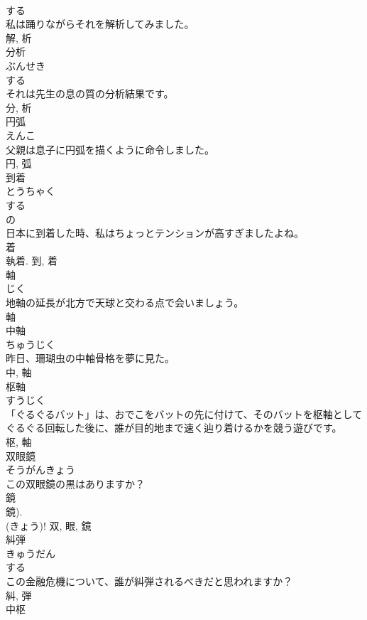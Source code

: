 \documentclass[8pt]{extreport}
\begin{document}
\begin{CJK}{UTF8}{min}
\\	する 
\\	私は踊りながらそれを解析してみました。	
\\	解, 析	
\\	分析	
\\	ぶんせき	
\\	する 
\\	それは先生の息の質の分析結果です。	
\\	分, 析	
\\	円弧	
\\	えんこ	
\\	父親は息子に円弧を描くように命令しました。	
\\	円, 弧	
\\	到着	
\\	とうちゃく	
\\	する 
\\	の 
\\	日本に到着した時、私はちょっとテンションが高すぎましたよね。	
\\	着 
\\	執着.	到, 着	
\\	軸	
\\	じく	
\\	地軸の延長が北方で天球と交わる点で会いましょう。	
\\	軸	
\\	中軸	
\\	ちゅうじく	
\\	昨日、珊瑚虫の中軸骨格を夢に見た。	
\\	中, 軸	
\\	枢軸	
\\	すうじく	
\\	「ぐるぐるバット」は、おでこをバットの先に付けて、そのバットを枢軸としてぐるぐる回転した後に、誰が目的地まで速く辿り着けるかを競う遊びです。	
\\	枢, 軸	
\\	双眼鏡	
\\	そうがんきょう	
\\	この双眼鏡の黒はありますか？	
\\	鏡 
\\	鏡). 
\\	(きょう)!	双, 眼, 鏡	
\\	糾弾	
\\	きゅうだん	
\\	する 
\\	この金融危機について、誰が糾弾されるべきだと思われますか？	
\\	糾, 弾	
\\	中枢	

\end{CJK}
\end{document}
